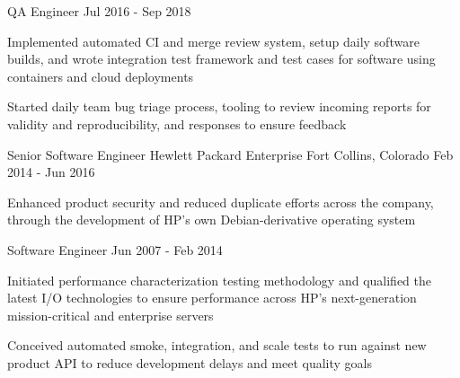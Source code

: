 \begin{cventries}
  \cventry
    {QA Engineer}
    {}
    {}
    {Jul 2016 - Sep 2018}
    {
      \begin{cvitems}
        \item {
          Implemented automated CI and merge review system, setup daily
          software builds, and wrote integration test framework and test
          cases for software using containers and cloud deployments
        }
        \item {
          Started daily team bug triage process, tooling to review
          incoming reports for validity and reproducibility, and responses
          to ensure feedback
        }
      \end{cvitems}
    }
    {}

  \cventry
    {Senior Software Engineer}
    {Hewlett Packard Enterprise}
    {Fort Collins, Colorado}
    {Feb 2014 - Jun 2016}
    {}
    {
      \begin{cvitems}
        \item {
          Enhanced product security and reduced duplicate efforts across the
          company, through the development of HP's own Debian-derivative
          operating system
        }
      \end{cvitems}
    }

  \cventry
    {Software Engineer}
    {}
    {}
    {Jun 2007 - Feb 2014}
    {}
    {
      \begin{cvitems}
        \item {
          Initiated performance characterization testing methodology and
          qualified the latest I/O technologies to ensure performance across
          HP’s next-generation mission-critical and enterprise servers
        }
        \item {
          Conceived automated smoke, integration, and scale tests to run
          against new product API to reduce development delays and meet
          quality goals
        }
      \end{cvitems}
    }

\end{cventries}